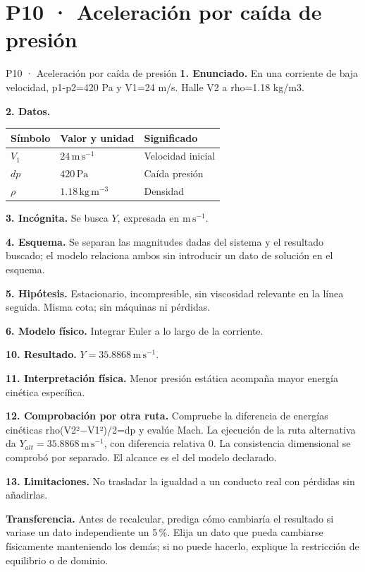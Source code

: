 \chapter*{P10 · Aceleración por caída de presión}
\begin{studiumworked}{P10 · Aceleración por caída de presión}
\textbf{1. Enunciado.} En una corriente de baja velocidad, p1-p2=420 Pa y V1=24 m/s. Halle V2 a rho=1.18 kg/m3.

\textbf{2. Datos.}
\begin{longtable}{p{.16\linewidth}p{.35\linewidth}p{.38\linewidth}}\toprule Símbolo & Valor y unidad & Significado\\\midrule\endhead
$V_{1}$ & $24\,\mathrm{m\,s^{-1}}$ & Velocidad inicial\\
$dp$ & $420\,\mathrm{Pa}$ & Caída presión\\
$\rho$ & $1.18\,\mathrm{kg\,m^{-3}}$ & Densidad\\
\bottomrule\end{longtable}
\textbf{3. Incógnita.} Se busca $Y$, expresada en $\mathrm{m\,s^{-1}}$.

\textbf{4. Esquema.} Se separan las magnitudes dadas del sistema y el resultado buscado; el modelo relaciona ambos sin introducir un dato de solución en el esquema.

\textbf{5. Hipótesis.} Estacionario, incompresible, sin viscosidad relevante en la línea seguida. Misma cota; sin máquinas ni pérdidas.

\textbf{6. Modelo físico.} Integrar Euler a lo largo de la corriente.


\textbf{10. Resultado.} $Y=35.8868\,\mathrm{m\,s^{-1}}$.

\textbf{11. Interpretación física.} Menor presión estática acompaña mayor energía cinética específica.

\textbf{12. Comprobación por otra ruta.} Compruebe la diferencia de energías cinéticas rho(V2²−V1²)/2=dp y evalúe Mach. La ejecución de la ruta alternativa da $Y_{alt}=35.8868\,\mathrm{m\,s^{-1}}$, con diferencia relativa $0$. La consistencia dimensional se comprobó por separado. El alcance es el del modelo declarado.

\textbf{13. Limitaciones.} No trasladar la igualdad a un conducto real con pérdidas sin añadirlas.

\textbf{Transferencia.} Antes de recalcular, prediga cómo cambiaría el resultado si variase un dato independiente un 5\,\%. Elija un dato que pueda cambiarse físicamente manteniendo los demás; si no puede hacerlo, explique la restricción de equilibrio o de dominio.\par
\end{studiumworked}
